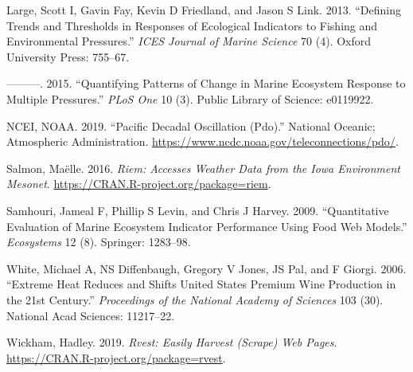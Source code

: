 \hypertarget{ref-large2013}{}
Large, Scott I, Gavin Fay, Kevin D Friedland, and Jason S Link. 2013.
``Defining Trends and Thresholds in Responses of Ecological Indicators
to Fishing and Environmental Pressures.'' \emph{ICES Journal of Marine
Science} 70 (4). Oxford University Press: 755--67.

\hypertarget{ref-large2015}{}
---------. 2015. ``Quantifying Patterns of Change in Marine Ecosystem
Response to Multiple Pressures.'' \emph{PLoS One} 10 (3). Public Library
of Science: e0119922.

\hypertarget{ref-ncei2019}{}
NCEI, NOAA. 2019. ``Pacific Decadal Oscillation (Pdo).'' National
Oceanic; Atmospheric Administration.
\url{https://www.ncdc.noaa.gov/teleconnections/pdo/}.

\hypertarget{ref-salmon2016}{}
Salmon, Maëlle. 2016. \emph{Riem: Accesses Weather Data from the Iowa
Environment Mesonet}. \url{https://CRAN.R-project.org/package=riem}.

\hypertarget{ref-samhouri2009}{}
Samhouri, Jameal F, Phillip S Levin, and Chris J Harvey. 2009.
``Quantitative Evaluation of Marine Ecosystem Indicator Performance
Using Food Web Models.'' \emph{Ecosystems} 12 (8). Springer: 1283--98.

\hypertarget{ref-white2006}{}
White, Michael A, NS Diffenbaugh, Gregory V Jones, JS Pal, and F Giorgi.
2006. ``Extreme Heat Reduces and Shifts United States Premium Wine
Production in the 21st Century.'' \emph{Proceedings of the National
Academy of Sciences} 103 (30). National Acad Sciences: 11217--22.

\hypertarget{ref-wickham2019}{}
Wickham, Hadley. 2019. \emph{Rvest: Easily Harvest (Scrape) Web Pages}.
\url{https://CRAN.R-project.org/package=rvest}.



